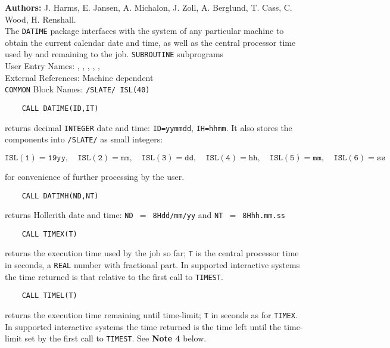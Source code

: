                     
                    
\Submitter{}                          
  
{\bf Authors:} J. Harms, E. Jansen, A. Michalon, J. Zoll,
A. Berglund, T. Cass, C. Wood, H. Renshall. \\[3mm]
The {\tt DATIME} package interfaces with the system of any particular
machine to obtain the current calendar date and time, as well as the
central processor time used by and remaining to the job.
\Structure
{\tt SUBROUTINE} subprograms \\
User Entry Names: , , ,
, , \\
External References: Machine dependent\\
{\tt COMMON} Block Names: {\tt /SLATE/ ISL(40)}
\Usage
\begin{verbatim}
    CALL DATIME(ID,IT)
\end{verbatim}
returns decimal {\tt INTEGER} date and time: {\tt ID=yymmdd},
{\tt IH=hhmm}.
It also stores the components into {\tt /SLATE/} as small integers:
\begin{center}
$\mathtt{ISL(1) = 19yy, \quad ISL(2) = mm, \quad ISL(3) = dd, \quad
ISL(4) = hh, \quad ISL(5) = mm, \quad ISL(6) = ss}$
\end{center}
for convenience of further processing by the user.
\begin{verbatim}
    CALL DATIMH(ND,NT)
\end{verbatim}
returns Hollerith date and time: {\tt ND $=$ 8Hdd/mm/yy} and
{\tt NT $=$ 8Hhh.mm.ss}
\begin{verbatim}
    CALL TIMEX(T)
\end{verbatim}
returns the execution time used by the job so far; {\tt T} is the central
processor time in seconds, a {\tt REAL} number with fractional part.
In supported interactive systems the time returned is that relative
to the first call to {\tt TIMEST}.
\begin{verbatim}
    CALL TIMEL(T)
\end{verbatim}
returns the execution time remaining until time-limit; {\tt T} in seconds
as for {\tt TIMEX}. In supported interactive systems the time returned
is the time left until the time-limit set by the first call to
{\tt TIMEST}. See {\bf Note 4} below.
